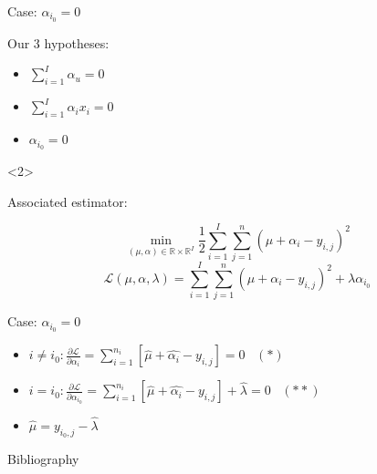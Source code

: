 \documentclass[unknownkeysallowed]{beamer}
\begin{document}
\begin{frame}{Case: $\alpha_{i_0}=0$}

Our 3 hypotheses:

\begin{itemize}
    \item $\sum\limits_{i=1}^{I}\alpha_u=0$
    
    \item $\sum\limits_{i=1}^{I}\alpha_ix_i=0$
    
    \item $\alpha_{i_0}=0$
\end{itemize}

\begin{onlyenv}<2>

Associated estimator:


\[\min_{(\mu,\alpha)\in\mathbb{R}\times\mathbb{R}^I}\frac{1}{2}\sum\limits_{i=1}^{I}\sum\limits_{j=1}^{n}(\mu+\alpha_i-y_{i,j})^2\]
\[\mathcal{L}(\mu,\alpha,\lambda)=\sum\limits_{i=1}^{I}\sum\limits_{j=1}^{n}(\mu+\alpha_i-y_{i,j})^2+\lambda\alpha_{i_0}\]

\end{onlyenv}
\end{frame}

\begin{frame}{Case: $\alpha_{i_0}=0$}
\begin{itemize}
    \item $i\ne i_0: \frac{\partial\mathcal{L}}{\partial\alpha_i}=\sum\limits_{i=1}^{n_i}[\hat{\mu}+\hat{\alpha_i}-y_{i,j}]=0\;\;\; (*)$
    \item $i=i_0: \frac{\partial\mathcal{L}}{\partial\alpha_{i_0}}=\sum\limits_{i=1}^{n_i}[\hat{\mu}+\hat{\alpha_i}-y_{i,j}]+\hat{\lambda}=0\;\;\; (**)$
    \item $\hat{\mu}=y_{i_0,j}-\hat{\lambda}$
\end{itemize} 
\end{frame}


\begin{frame}{Bibliography}
\nocite{*}
\printbibliography
\end{frame}
\end{document}
